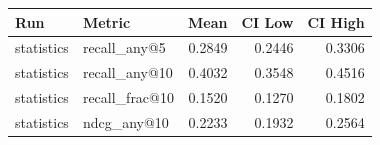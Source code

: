 \begin{tabular}{llrrr}
\toprule
Run & Metric & Mean & CI Low & CI High \\
\midrule
statistics & recall\_any@5 & 0.2849 & 0.2446 & 0.3306 \\
statistics & recall\_any@10 & 0.4032 & 0.3548 & 0.4516 \\
statistics & recall\_frac@10 & 0.1520 & 0.1270 & 0.1802 \\
statistics & ndcg\_any@10 & 0.2233 & 0.1932 & 0.2564 \\
\bottomrule
\end{tabular}
